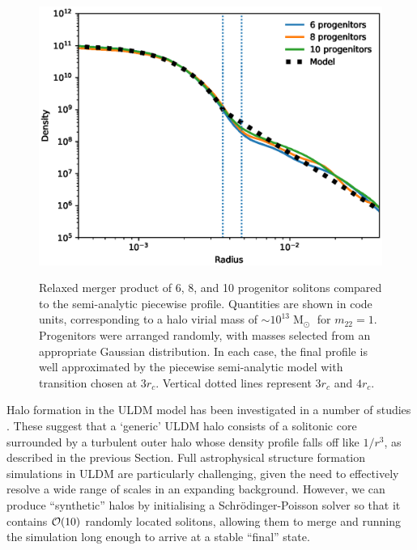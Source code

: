 \documentclass[a4paper,11pt]{article}
\begin{document}
\begin{figure}
\centering
{\includegraphics[scale = 0.7, trim={1cm 0cm 1cm 0.35cm}]{pics/M_combined.eps}} 
\caption{Relaxed merger product of 6, 8, and 10 progenitor solitons compared to the semi-analytic piecewise profile. Quantities are shown in code units, corresponding to a halo virial mass of $\sim 10^{13}\operatorname{M}_{\odot}$ for $m_{22}=1$.  Progenitors were arranged randomly, with masses selected from an appropriate Gaussian distribution. In each case, the final profile is well approximated by the piecewise semi-analytic model with transition chosen at $3 r_c$. Vertical dotted lines represent $3r_c$ and $4r_c$.  }\label{fig:validity}
\end{figure}


Halo formation in the ULDM model has been investigated in a number of studies \cite{Schwabe:2016rze, Mocz:2017wlg, Lin:2018whl}. These suggest that a `generic' ULDM halo consists of a solitonic core surrounded by a turbulent outer halo whose density profile falls off like $1/r^3$, as described in the previous Section. Full astrophysical structure formation simulations in ULDM are particularly challenging, given the need to effectively resolve a wide range of scales in an expanding background. However, we can produce ``synthetic'' halos by initialising a Schr{\"o}dinger-Poisson solver so that it contains ${\cal{O}}(10)$ randomly located solitons, allowing them to merge and running the simulation long enough to arrive at a stable ``final'' state. 
\end{document}
